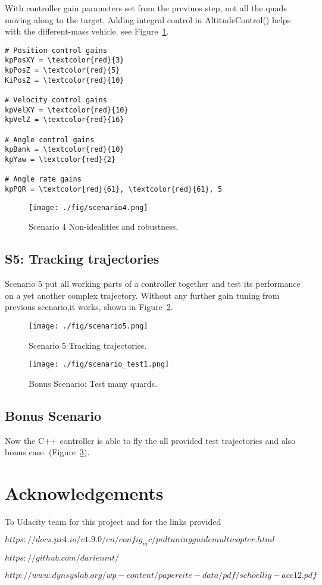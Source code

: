 \documentclass[letterpaper]{article}
\begin{document}
With controller gain parameters set from the previuos step, not all the quads  moving along to the target. Adding integral control in AltitudeControl() helps with the different-mass vehicle. see Figure~\ref{fig:scenario4}.

\begin{Verbatim}[frame=single, commandchars=\\\{\}]
# Position control gains
kpPosXY = \textcolor{red}{3}
kpPosZ = \textcolor{red}{5}
KiPosZ = \textcolor{red}{10}

# Velocity control gains
kpVelXY = \textcolor{red}{10}
kpVelZ = \textcolor{red}{16}

# Angle control gains
kpBank = \textcolor{red}{10}
kpYaw = \textcolor{red}{2}

# Angle rate gains
kpPQR = \textcolor{red}{61}, \textcolor{red}{61}, 5
\end{Verbatim}



\begin{figure}[ht]
\centering
\texttt{[image: ./fig/scenario4.png]}
\caption{\label{fig:scenario4} Scenario 4 Non-idealities and robustness.}
\end{figure}

\subsection{S5: Tracking trajectories}

Scenario 5 put all working parts of a controller together and test its performance on a yet another complex trajectory. Without any further gain tuning from previous scenario,it works, shown in Figure~\ref{fig:scenario5}.


\begin{figure}[ht]
\centering
\texttt{[image: ./fig/scenario5.png]}
\caption{\label{fig:scenario5} Scenario 5 Tracking trajectories.}
\end{figure}
\begin{figure}[!ht]
	\centering
	\texttt{[image: ./fig/scenario\_test1.png]}
	\caption{\label{fig:scenario_test1} Bonus Scenario: Test many quards.}
\end{figure}
\subsection{Bonus Scenario}

Now the C++ controller is able to fly the all provided test trajectories and also bonus case.  (Figure~\ref{fig:scenario_test1}). 



\section*{Acknowledgements}

To Udacity team for this project and for the links provided

$
https://docs.px4.io/v1.9.0/en/config_mc/pidtuningguidemulticopter.html $

$https://github.com/darienmt/$

$
http://www.dynsyslab.org/wp-content/papercite-data/pdf/schoellig-acc12.pdf
$
\end{document}
